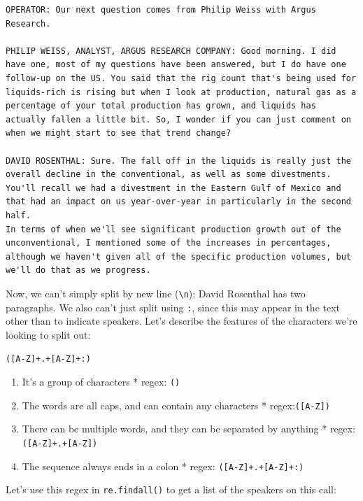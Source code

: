 \documentclass[
  letterpaper,
  DIV=11,
  numbers=noendperiod]{scrreprt}
\providecommand{\tightlist}{%
  \setlength{\itemsep}{0pt}\setlength{\parskip}{0pt}}\usepackage{longtable,booktabs,array}
\begin{document}
\begin{verbatim}
OPERATOR: Our next question comes from Philip Weiss with Argus Research.

PHILIP WEISS, ANALYST, ARGUS RESEARCH COMPANY: Good morning. I did have one, most of my questions have been answered, but I do have one follow-up on the US. You said that the rig count that's being used for liquids-rich is rising but when I look at production, natural gas as a percentage of your total production has grown, and liquids has actually fallen a little bit. So, I wonder if you can just comment on when we might start to see that trend change?

DAVID ROSENTHAL: Sure. The fall off in the liquids is really just the overall decline in the conventional, as well as some divestments. You'll recall we had a divestment in the Eastern Gulf of Mexico and that had an impact on us year-over-year in particularly in the second half.
In terms of when we'll see significant production growth out of the unconventional, I mentioned some of the increases in percentages, although we haven't given all of the specific production volumes, but we'll do that as we progress.
\end{verbatim}

Now, we can't simply split by new line (\texttt{\textbackslash{}n});
David Rosenthal has two paragraphs. We also can't just split using
\texttt{:}, since this may appear in the text other than to indicate
speakers. Let's describe the features of the characters we're looking to
split out:

\texttt{({[}A-Z{]}+.+{[}A-Z{]}+:)}

\begin{enumerate}
\def\labelenumi{\arabic{enumi}.}
\tightlist
\item
  It's a group of characters * regex: \texttt{()}
\item
  The words are all caps, and can contain any characters *
  regex:\texttt{({[}A-Z{]})}
\item
  There can be multiple words, and they can be separated by anything *
  regex: \texttt{({[}A-Z{]}+.+{[}A-Z{]})}
\item
  The sequence always ends in a colon * regex:
  \texttt{({[}A-Z{]}+.+{[}A-Z{]}+:)}
\end{enumerate}

Let's use this regex in \texttt{re.findall()} to get a list of the
speakers on this call:
\end{document}
